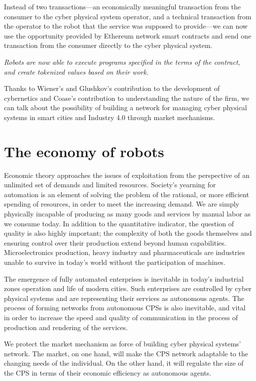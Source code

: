 \documentclass{article}
\begin{document}
Instead of two transactions—an economically meaningful transaction from the consumer to the cyber physical system operator, and a technical transaction from the operator to the robot that the service was supposed to provide—we can now use the opportunity provided by Ethereum network smart contracts and send one transaction from the consumer directly to the cyber physical system.

\textit{Robots are now able to execute programs specified in the terms of the contract, and create tokenized values based on their work.}

Thanks to Wiener’s \cite{Wiener1961CyberneticsEd} and Glushkov’s \cite{SergienkoIvan2014TopicalGlushkov} contribution to the development of cybernetics and Coase's \cite{Coase1937TheFirm} contribution to understanding the nature of the firm, we can talk about the possibility of building a network for managing cyber physical systems in smart cities and Industry 4.0 through market mechanisms.

\section{The economy of robots}

Economic theory approaches the issues of exploitation from the perspective of an unlimited set of demands and limited resources. Society's yearning for automation is an element of solving the problem of the rational, or more efficient spending of resources, in order to meet the increasing demand. We are simply physically incapable of producing as many goods and services by manual labor as we consume today. In addition to the quantitative indicator, the question of quality is also highly important; the complexity of both the goods themselves and ensuring control over their production extend beyond human capabilities. Microelectronics production, heavy industry and pharmaceuticals are industries unable to survive in today’s world without the participation of machines.

The emergence of fully automated enterprises is inevitable in today’s industrial zones operation and life of modern cities. Such enterprises are controlled by cyber physical systems and are representing their services as autonomous agents. The process of forming networks from autonomous CPSs is also inevitable, and vital in order to increase the speed and quality of communication in the process of production and rendering of the services.

We protect the market mechanism as force of building cyber physical systems’ network. The market, on one hand, will make the CPS network adaptable to the changing needs of the individual. On the other hand, it will regulate the size of the CPS in terms of their economic efficiency as autonomous agents.
\end{document}
